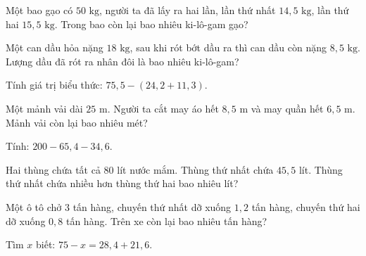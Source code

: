 \begin{ex}
  Một bao gạo có $50\text{ kg}$, người ta đã lấy ra hai lần, lần thứ nhất $14{,}5\text{ kg}$, lần thứ hai $15{,}5\text{ kg}$. Trong bao còn lại bao nhiêu ki-lô-gam gạo?
\end{ex}

\begin{ex}
  Một can dầu hỏa nặng $18\text{ kg}$, sau khi rót bớt dầu ra thì can dầu còn nặng $8{,}5\text{ kg}$. Lượng dầu đã rót ra nhân đôi là bao nhiêu ki-lô-gam?
\end{ex}

\begin{ex}
  Tính giá trị biểu thức: $75{,}5 - (24{,}2 + 11{,}3)$.
\end{ex}

\begin{ex}
  Một mảnh vải dài $25\text{ m}$. Người ta cắt may áo hết $8{,}5\text{ m}$ và may quần hết $6{,}5\text{ m}$. Mảnh vải còn lại bao nhiêu mét?
\end{ex}

\begin{ex}
  Tính: $200 - 65{,}4 - 34{,}6$.
\end{ex}

\begin{ex}
  Hai thùng chứa tất cả $80$ lít nước mắm. Thùng thứ nhất chứa $45{,}5$ lít. Thùng thứ nhất chứa nhiều hơn thùng thứ hai bao nhiêu lít?
\end{ex}

\begin{ex}
  Một ô tô chở $3$ tấn hàng, chuyến thứ nhất dỡ xuống $1{,}2$ tấn hàng, chuyến thứ hai dỡ xuống $0{,}8$ tấn hàng. Trên xe còn lại bao nhiêu tấn hàng?
\end{ex}

\begin{ex}
  Tìm $x$ biết: $75 - x = 28{,}4 + 21{,}6$.
\end{ex}

